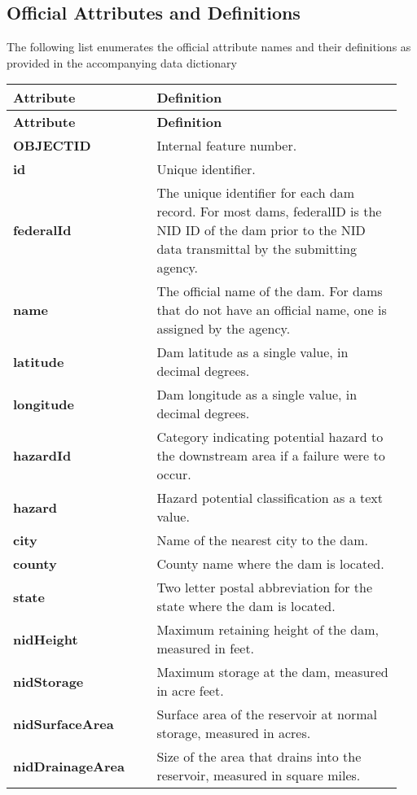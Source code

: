\documentclass{article}
\begin{document}
\subsection*{Official Attributes and Definitions}
The following list enumerates the official attribute names and their definitions as provided in the accompanying data dictionary

\begin{longtable}{p{0.35\linewidth} p{0.6\linewidth}}
\hline
\textbf{Attribute} & \textbf{Definition} \\
\hline
\endfirsthead
\hline
\textbf{Attribute} & \textbf{Definition} \\
\hline
\endhead
\hline
\endfoot
\textbf{OBJECTID} & Internal feature number. \\\hline
\textbf{id} & Unique identifier. \\\hline
\textbf{federalId} & The unique identifier for each dam record. For most dams, federalID is the NID ID of the dam prior to the NID data transmittal by the submitting agency. \\\hline
\textbf{name} & The official name of the dam. For dams that do not have an official name, one is assigned by the agency. \\\hline
\textbf{latitude} & Dam latitude as a single value, in decimal degrees. \\\hline
\textbf{longitude} & Dam longitude as a single value, in decimal degrees. \\\hline
\textbf{hazardId} & Category indicating potential hazard to the downstream area if a failure were to occur. \\\hline
\textbf{hazard} & Hazard potential classification as a text value. \\\hline
\textbf{city} & Name of the nearest city to the dam. \\\hline
\textbf{county} & County name where the dam is located. \\\hline
\textbf{state} & Two letter postal abbreviation for the state where the dam is located. \\\hline
\textbf{nidHeight} & Maximum retaining height of the dam, measured in feet. \\\hline
\textbf{nidStorage} & Maximum storage at the dam, measured in acre feet. \\\hline
\textbf{nidSurfaceArea} & Surface area of the reservoir at normal storage, measured in acres. \\\hline
\textbf{nidDrainageArea} & Size of the area that drains into the reservoir, measured in square miles. \\\hline

\end{longtable}
\end{document}
